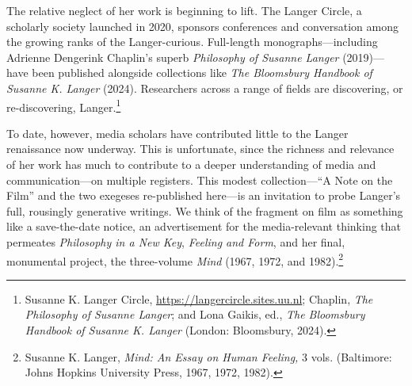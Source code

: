 \documentclass{tufte-handout}
\begin{document}
The relative neglect of her work is beginning to lift. The Langer
Circle, a scholarly society launched in 2020, sponsors conferences and
conversation among\setcounter{footnote}{9} the growing ranks of the Langer-curious. Full-length
monographs---including Adrienne Dengerink Chaplin's superb
\emph{Philosophy of Susanne Langer} (2019)---have been published
alongside collections like \emph{The Bloomsbury Handbook of Susanne K.
Langer} (2024). Researchers across a range of fields are discovering, or
re-discovering, Langer.\footnote{Susanne K. Langer Circle,
  \url{https://langercircle.sites.uu.nl}; Chaplin, \emph{The Philosophy of
  Susanne Langer}; and Lona Gaikis, ed., \emph{The Bloomsbury Handbook
  of Susanne K. Langer} (London: Bloomsbury, 2024).}

To date, however, media scholars have contributed little to the Langer
renaissance now underway. This is unfortunate, since the richness and
relevance of her work has much to contribute to a deeper understanding
of media and communication---on multiple registers. This modest
collection---``A Note on the Film'' and the two exegeses re-published
here---is an invitation to probe Langer's full, rousingly generative
writings. We think of the fragment on film as something like a
save-the-date notice, an advertisement for the media-relevant thinking
that permeates \emph{Philosophy in a New Key}, \emph{Feeling and Form},
and her final, monumental project, the three-volume \emph{Mind} (1967,
1972, and 1982).\footnote{Susanne K. Langer, \emph{Mind: An Essay on
  Human Feeling,} 3 vols. (Baltimore: Johns Hopkins University Press,
  1967, 1972, 1982).}
\end{document}
